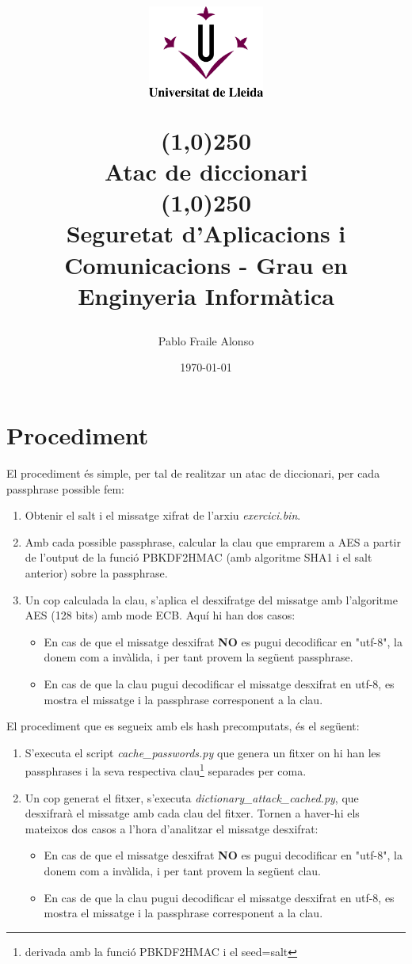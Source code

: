 \documentclass[12pt, letterpaper]{article}
\title{%
    \begin{center}
	\includegraphics[width=4cm,height=3cm]{udl.png}
    \end{center}
    \line(1,0){250}\\[0.3cm]
    \textbf{Atac de diccionari} \\
    \line(1,0){250}
    \\[0.5cm]
	\large Seguretat d'Aplicacions i Comunicacions - Grau en Enginyeria Informàtica
}
\author{Pablo Fraile Alonso}
\date{\today}
\begin{document}
    
\maketitle
\thispagestyle{empty}
\newpage
\tableofcontents
\listoffigures
\newpage

\section{Procediment}
El procediment és simple, per tal de realitzar un atac de diccionari, per cada passphrase possible fem:
\begin{enumerate}
    \item Obtenir el salt i el missatge xifrat de l'arxiu \textit{exercici.bin}.
    \item Amb cada possible passphrase, calcular la clau que emprarem a AES a partir de l'output de la funció PBKDF2HMAC (amb algoritme SHA1 i el salt anterior) sobre la passphrase.
    \item Un cop calculada la clau, s'aplica el desxifratge del missatge amb l'algoritme AES (128 bits) amb mode ECB. Aquí hi han dos casos:
        \begin{itemize}
            \item En cas de que el missatge desxifrat \textbf{NO} es pugui decodificar en "utf-8", la donem com a invàlida, i per tant provem la següent passphrase.
            \item En cas de que la clau pugui decodificar el missatge desxifrat en utf-8, es mostra el missatge i la passphrase corresponent a la clau.
        \end{itemize}
\end{enumerate}

El procediment que es segueix amb els hash precomputats, és el següent:
\begin{enumerate}
    \item S'executa el script \textit{cache\_passwords.py} que genera un fitxer on hi han les passphrases i la seva respectiva clau\footnote{derivada amb la funció PBKDF2HMAC i el seed=salt} separades per coma.
    \item Un cop generat el fitxer, s'executa \textit{dictionary\_attack\_cached.py}, que desxifrarà el missatge amb cada clau del fitxer. Tornen a haver-hi els mateixos dos casos a l'hora d'analitzar el missatge desxifrat:
        \begin{itemize}
            \item En cas de que el missatge desxifrat \textbf{NO} es pugui decodificar en "utf-8", la donem com a invàlida, i per tant provem la següent clau.
            \item En cas de que la clau pugui decodificar el missatge desxifrat en utf-8, es mostra el missatge i la passphrase corresponent a la clau.
        \end{itemize}
\end{enumerate}
\end{document}
